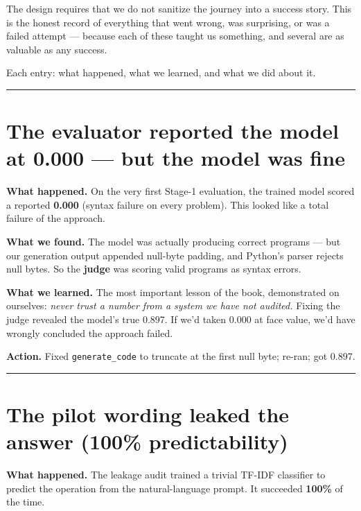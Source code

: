 The design requires that we do not sanitize the journey into a success
story. This is the honest record of everything that went wrong, was
surprising, or was a failed attempt --- because each of these taught us
something, and several are as valuable as any success.

Each entry: what happened, what we learned, and what we did about it.

\begin{center}\rule{0.5\linewidth}{0.5pt}\end{center}

\section{The evaluator reported the model at 0.000 --- but the model was
fine}\label{the-evaluator-reported-the-model-at-0.000-but-the-model-was-fine}

\textbf{What happened.} On the very first Stage-1 evaluation, the
trained model scored a reported \textbf{0.000} (syntax failure on every
problem). This looked like a total failure of the approach.

\textbf{What we found.} The model was actually producing correct
programs --- but our generation output appended null-byte padding, and
Python's parser rejects null bytes. So the \textbf{judge} was scoring
valid programs as syntax errors.

\textbf{What we learned.} The most important lesson of the book,
demonstrated on ourselves: \emph{never trust a number from a system we
have not audited.} Fixing the judge revealed the model's true 0.897. If
we'd taken 0.000 at face value, we'd have wrongly concluded the approach
failed.

\textbf{Action.} Fixed \texttt{generate\_code} to truncate at the first
null byte; re-ran; got 0.897.

\begin{center}\rule{0.5\linewidth}{0.5pt}\end{center}

\section{The pilot wording leaked the answer (100\%
predictability)}\label{the-pilot-wording-leaked-the-answer-100-predictability}

\textbf{What happened.} The leakage audit trained a trivial TF-IDF
classifier to predict the operation from the natural-language prompt. It
succeeded \textbf{100\%} of the time.

